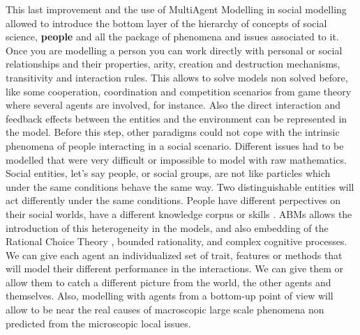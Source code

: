 \documentclass[11pt,oneside,a4paper,openright]{report}
\begin{document}
This last improvement and the use of MultiAgent Modelling in social modelling allowed to introduce the bottom layer of the hierarchy of concepts of social science, \textbf{people} and all the package of phenomena and issues associated to it. Once you are modelling a person you can work directly with personal or social relationships and their properties, arity, creation and destruction mechanisms, transitivity and interaction rules. This allows to solve models non solved before, like some cooperation, coordination and competition scenarios from game theory where several agents are involved, for instance. Also the direct interaction and feedback effects between the entities and the environment can be represented in the model. Before this step, other paradigms could not cope with the intrinsic phenomena of people interacting in a social scenario. Different issues had to be modelled that were very difficult or impossible to model with raw mathematics.
Social entities, let's say people, or social groups, are not like particles which under the same conditions behave the same way. Two distinguishable entities will act differently under the same conditions. People have different perpectives on their social worlds, have a different knowledge corpus or skills \cite{GilbertTroitzsch_pg19}. ABMs allows the introduction of this heterogeneity in the models, and also embedding of the Rational Choice Theory \cite{Scott2000}, bounded rationality, and complex cognitive processes. We can give each agent an individualized set of trait, features or methods that will model their different performance in the interactions. We can give them or allow them to catch a different picture from the world, the other agents and themselves. Also, modelling with agents from a bottom-up point of view will allow to be near the real causes of macroscopic large scale phenomena non predicted from the microscopic local issues. 
 
\end{document}
